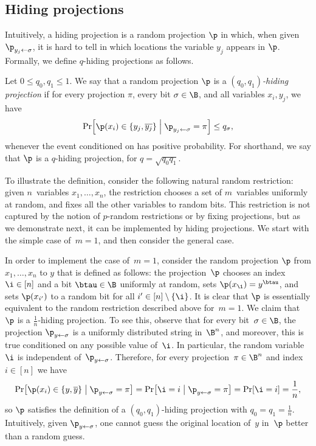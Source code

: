 \documentclass{toc}
\begin{document}
\subsection{\label{subsec:Hiding-projections}Hiding projections}

Intuitively, a hiding projection is a random projection $\p$ in which,
when given $\p_{y_{j}\gets\sigma}$, it is hard to tell in which locations
the variable $y_{j}$ appears in $\p$. Formally, we define $q$-hiding
projections as follows. 
\begin{definition}
\label{def:hiding-projections}Let $0\leq q_{0},q_{1}\leq1$. We say that
a random projection $\p$ is a \emph{$(q_{0},q_{1})$-hiding projection}
if for every projection $\pi$, every bit $\sigma\in\B$, and all
variables $x_{i},y_{j}$, we have 
\[
\Pr\!\left[\p(x_{i})\in\left\{ y_{j},\overline{y_{j}}\right\} \;\middle|\;\p_{y_{j}\gets\sigma}=\pi\right]\leq q_{\sigma},
\]
whenever the event conditioned on has positive probability. For shorthand,
we say that $\p$ is a $q$-hiding projection, for $q=\sqrt{q_{0}q_{1}}$. 
\end{definition}

\noindent To illustrate the definition, consider the following natural
random restriction: given $n$~variables $x_{1},\ldots,x_{n}$, the
restriction chooses a set of $m$~variables uniformly at random,
and fixes all the other variables to random bits. This restriction
is not captured by the notion of $p$-random restrictions or by fixing
projections, but as we demonstrate next, it can be implemented by
hiding projections. We start with the simple case of~$m=1$, and
then consider the general case. 
\begin{example}
\label{ex:random-edge}In order to implement the case of~$m=1$, consider
the random projection $\p$ from $x_{1},\ldots,x_{n}$ to $y$ that
is defined as follows: the projection~$\p$ chooses an index~$\i\in\left[n\right]$
and a bit $\btau\in\B$ uniformly at random, sets $\p(x_{\i})=y^{\btau}$,
and sets $\p(x_{i'})$ to a random bit for all $i'\in\left[n\right]\setminus\left\{ \i\right\} $.
It is clear that $\p$ is essentially equivalent to the random restriction
described above for~$m=1$. We claim that $\p$ is a $\frac{1}{n}$-hiding
projection. To see this, observe that for every bit~$\sigma\in\B$,
the projection $\p_{y\gets\sigma}$ is a uniformly distributed string
in~$\B^{n}$, and moreover, this is true conditioned on any possible
value of~$\i$. In particular, the random variable~$\i$ is independent
of~$\p_{y\gets\sigma}$. Therefore, for every projection~$\pi\in\B^{n}$
and index~$i\in\left[n\right]$ we have 
\[
\Pr\!\left[\p(x_{i})\in\left\{ y,\overline{y}\right\} \;\middle|\;\p_{y\gets\sigma}=\pi\right]=\Pr\!\left[\i=i\;\middle|\;\p_{y\gets\sigma}=\pi\right]=\Pr\!\left[\i=i\right]=\frac{1}{n},
\]
so $\p$ satisfies the definition of a $(q_{0},q_{1})$-hiding projection
with $q_{0}=q_{1}=\frac{1}{n}$. Intuitively, given $\p_{y\gets\sigma}$,
one cannot guess the original location of~$y$ in~$\p$ better than
a random guess.
\end{example}
\end{document}
